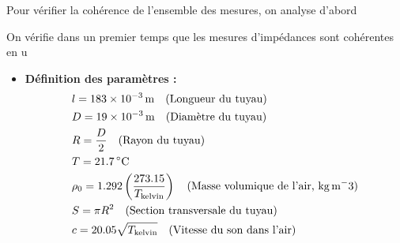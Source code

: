 \documentclass[atiam, article]{rapport} %
\begin{document}
Pour vérifier la cohérence de l'ensemble des mesures, on analyse d'abord

On vérifie dans un premier temps que les mesures d'impédances sont cohérentes en u

\begin{itemize}
    \item \textbf{Définition des paramètres :}
    \begin{align*}
        & l = \SI{183e-3}{\meter} \quad \text{(Longueur du tuyau)} \\
        & D = \SI{19e-3}{\meter} \quad \text{(Diamètre du tuyau)} \\
        & R = \frac{D}{2} \quad \text{(Rayon du tuyau)} \\
        & T = \SI{21.7}{\celsius} \\
        & \rho_0 = 1.292 \left(\frac{273.15}{T_{\text{kelvin}}}\right) \quad \text{(Masse volumique de l'air, \si{\kg.\m^-3})} \\
        & S = \pi R^2 \quad \text{(Section transversale du tuyau)} \\
        & c = 20.05 \sqrt{T_{\text{kelvin}}} \quad \text{(Vitesse du son dans l'air)}
    \end{align*}


\end{itemize}
\end{document}
